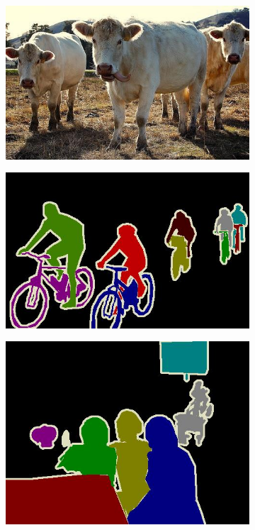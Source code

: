 \begin{figure}[h]
\begin{subfigure}{.25\textwidth}
\end{subfigure}%
\begin{subfigure}{.25\textwidth}
  \includegraphics[width=1.\linewidth,height=0.618\linewidth]{figures/pascal_dataset/image-4.jpg}
\end{subfigure}
\begin{subfigure}{.25\textwidth}
  \includegraphics[width=1.\linewidth,height=0.618\linewidth]{figures/pascal_dataset/annotation-1.jpg}
\end{subfigure}%
\begin{subfigure}{.25\textwidth}
  \includegraphics[width=1.\linewidth,height=0.618\linewidth]{figures/pascal_dataset/annotation-2.jpg}

\end{subfigure}
\end{figure}
